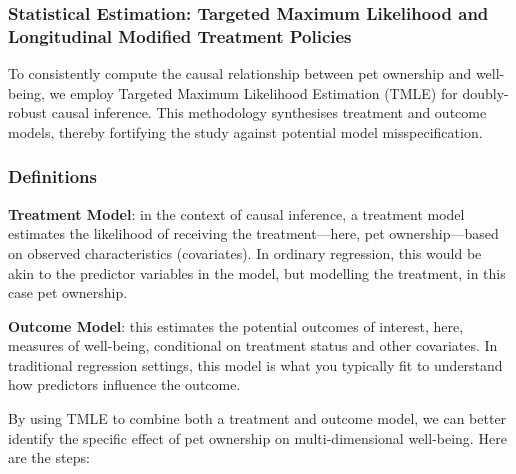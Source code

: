\documentclass[
  singlecolumn,
  9pt]{article}
\begin{document}
\newpage{}

\subsubsection{Statistical Estimation: Targeted Maximum Likelihood and
Longitudinal Modified Treatment
Policies}\label{statistical-estimation-targeted-maximum-likelihood-and-longitudinal-modified-treatment-policies}

To consistently compute the causal relationship between pet ownership
and well-being, we employ Targeted Maximum Likelihood Estimation (TMLE)
for doubly-robust causal inference. This methodology synthesises
treatment and outcome models, thereby fortifying the study against
potential model misspecification.

\subsubsection{Definitions}\label{definitions}

\textbf{Treatment Model}: in the context of causal inference, a
treatment model estimates the likelihood of receiving the
treatment---here, pet ownership---based on observed characteristics
(covariates). In ordinary regression, this would be akin to the
predictor variables in the model, but modelling the treatment, in this
case pet ownership.

\textbf{Outcome Model}: this estimates the potential outcomes of
interest, here, measures of well-being, conditional on treatment status
and other covariates. In traditional regression settings, this model is
what you typically fit to understand how predictors influence the
outcome.

By using TMLE to combine both a treatment and outcome model, we can
better identify the specific effect of pet ownership on
multi-dimensional well-being. Here are the steps:
\end{document}
